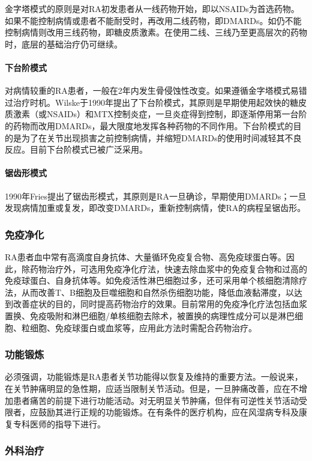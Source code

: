 金字塔模式的原则是对RA初发患者从一线药物开始，即以NSAIDs为首选药物。如果不能控制病情或患者不能耐受时，再改用二线药物，即DMARDs。如仍不能控制病情则改用三线药物，即糖皮质激素。在使用二线、三线乃至更高层次的药物时，底层的基础治疗仍可继续。
\paragraph{下台阶模式}

对病情较重的RA患者，一般在2年内发生骨侵蚀性改变。如果遵循金字塔模式易错过治疗时机。Wilske于1990年提出了下台阶模式，其原则是早期使用起效快的糖皮质激素（或NSAIDs）和MTX控制炎症，一旦炎症得到控制，即逐渐停用第一台阶的药物而改用DMARDs，最大限度地发挥各种药物的不同作用。下台阶模式的目的是为了在关节出现损害之前控制病情，并缩短DMARDs的使用时间减轻其不良反应。目前下台阶模式已被广泛采用。
\paragraph{锯齿形模式}

1990年Fries提出了锯齿形模式，其原则是RA一旦确诊，早期使用DMARDs；一旦发现病情加重或复发，即改变DMARDs，重新控制病情，使RA的病程呈锯齿形。

\subsubsection{免疫净化}

RA患者血中常有高滴度自身抗体、大量循环免疫复合物、高免疫球蛋白等。因此，除药物治疗外，可选用免疫净化疗法，快速去除血浆中的免疫复合物和过高的免疫球蛋白、自身抗体等。如免疫活性淋巴细胞过多，还可采用单个核细胞清除疗法，从而改善T、B细胞及巨噬细胞和自然杀伤细胞功能，降低血液黏滞度，以达到改善症状的目的，同时提高药物治疗的效果。目前常用的免疫净化疗法包括血浆置换、免疫吸附和淋巴细胞/单核细胞去除术，被置换的病理性成分可以是淋巴细胞、粒细胞、免疫球蛋白或血浆等，应用此方法时需配合药物治疗。

\subsubsection{功能锻炼}

必须强调，功能锻炼是RA患者关节功能得以恢复及维持的重要方法。一般说来，在关节肿痛明显的急性期，应适当限制关节活动。但是，一旦肿痛改善，应在不增加患者痛苦的前提下进行功能活动。对无明显关节肿痛，但伴有可逆性关节活动受限者，应鼓励其进行正规的功能锻炼。在有条件的医疗机构，应在风湿病专科及康复专科医师的指导下进行。

\subsubsection{外科治疗}

